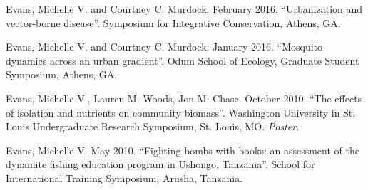 \begin{cvitems}
	\item Evans, Michelle V. and Courtney C. Murdock. February 2016. ``Urbanization and vector-borne disease''. Symposium for Integrative Conservation, Athens, GA.

	\item Evans, Michelle V. and Courtney C. Murdock. January 2016. ``Mosquito dynamics across an urban gradient''. Odum School of Ecology, Graduate Student Symposium, Athens, GA.

	\item Evans, Michelle V., Lauren M. Woods, Jon M. Chase. October 2010. ``The effects of isolation and nutrients on community biomass''. Washington University in St. Louis Undergraduate Research Symposium, St. Louis, MO. \textit{Poster.}

	\item Evans, Michelle V. May 2010. ``Fighting bombs with books: an assessment of the dynamite fishing education program in Ushongo, Tanzania''. School for International Training Symposium, Arusha, Tanzania.

	\bigskip
\end{cvitems}
